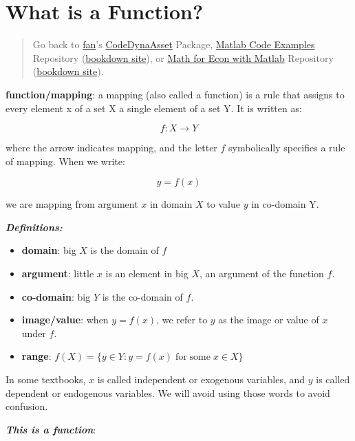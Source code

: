 \documentclass[
]{book}
\begin{document}
\hypertarget{what-is-a-function}{%
\section{What is a Function?}\label{what-is-a-function}}

\begin{quote}
Go back to \href{http://fanwangecon.github.io/}{fan}'s \href{https://fanwangecon.github.io/CodeDynaAsset/}{CodeDynaAsset} Package, \href{https://fanwangecon.github.io/M4Econ/}{Matlab Code Examples} Repository (\href{https://fanwangecon.github.io/M4Econ/bookdown}{bookdown site}), or \href{https://fanwangecon.github.io/Math4Econ/}{Math for Econ with Matlab} Repository (\href{https://fanwangecon.github.io/Math4Econ/bookdown}{bookdown site}).
\end{quote}

\textbf{function/mapping}: a mapping (also called a function) is a rule that
assigns to every element x of a set X a single element of a set Y. It is
written as:

\[f:X\to Y\]

where the arrow indicates mapping, and the letter \(f\) symbolically
specifies a rule of mapping. When we write:

\[y=f(x)\]

we are mapping from argument \(x\) in domain \(X\) to value \(y\) in co-domain
Y.

\textbf{\emph{Definitions:}}

\begin{itemize}
\item
  \textbf{domain}: big \(X\) is the domain of \(f\)
\item
  \textbf{argument}: little \(x\) is an element in big \(X\), an argument of
  the function \(f\).
\item
  \textbf{co-domain}: big \(Y\) is the co-domain of \(f\).
\item
  \textbf{image/value}: when \(y=f(x)\), we refer to \(y\) as the image or
  value of \(x\) under \(f\).
\item
  \textbf{range}:
  \(f(X)=\lbrace y\in Y:y=f(x)\;\textrm{for}\;\textrm{some}\;x\in X\rbrace\)
\end{itemize}

In some textbooks, \(x\) is called independent or exogenous variables, and
\(y\) is called dependent or endogenous variables. We will avoid using
those words to avoid confusion.

\textbf{\emph{This is a function}}:
\end{document}
